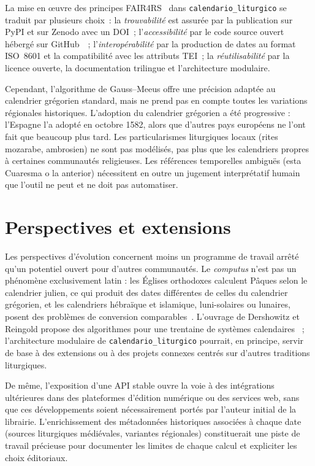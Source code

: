 \documentclass[final, fra]{anthology-ch}     %
\begin{document}
La mise en œuvre des principes FAIR4RS~\cite{chuehong2022, munafo2017} dans \texttt{calendario\_liturgico} se traduit par plusieurs choix~: la \textit{trouvabilité} est assurée par la publication sur PyPI et sur Zenodo avec un DOI~; l'\textit{accessibilité} par le code source ouvert hébergé sur GitHub~\cite{echavarria2025github}~; l'\textit{interopérabilité} par la production de dates au format ISO~8601 et la compatibilité avec les attributs TEI~; la \textit{réutilisabilité} par la licence ouverte, la documentation trilingue et l'architecture modulaire.

Cependant, l'algorithme de Gauss--Meeus offre une précision adaptée au calendrier grégorien standard, mais ne prend pas en compte toutes les variations régionales historiques. L'adoption du calendrier grégorien a été progressive : l'Espagne l'a adopté en octobre 1582, alors que d'autres pays européens ne l'ont fait que beaucoup plus tard. Les particularismes liturgiques locaux (rites mozarabe, ambrosien) ne sont pas modélisés, pas plus que les calendriers propres à certaines communautés religieuses. Les références temporelles ambiguës (\og esta Cuaresma o la anterior\fg{}) nécessitent en outre un jugement interprétatif humain que l'outil ne peut et ne doit pas automatiser.


\section{Perspectives et extensions} \label{sec:perspectives}

Les perspectives d'évolution concernent moins un programme de travail arrêté qu'un potentiel ouvert pour d'autres communautés. Le \textit{computus} n'est pas un phénomène exclusivement latin : les Églises orthodoxes calculent Pâques selon le calendrier julien, ce qui produit des dates différentes de celles du calendrier grégorien, et les calendriers hébraïque et islamique, luni-solaires ou lunaires, posent des problèmes de conversion comparables~\cite{dershowitz2018}. L'ouvrage de Dershowitz et Reingold propose des algorithmes pour une trentaine de systèmes calendaires~\cite{dershowitz2018} ; l'architecture modulaire de \texttt{calendario\_liturgico} pourrait, en principe, servir de base à des extensions ou à des projets connexes centrés sur d'autres traditions liturgiques.

De même, l'exposition d'une API stable ouvre la voie à des intégrations ultérieures dans des plateformes d'édition numérique ou des services web, sans que ces développements soient nécessairement portés par l'auteur initial de la librairie. L'enrichissement des métadonnées historiques associées à chaque date (sources liturgiques médiévales, variantes régionales) constituerait une piste de travail précieuse pour documenter les limites de chaque calcul et expliciter les choix éditoriaux.
\end{document}
